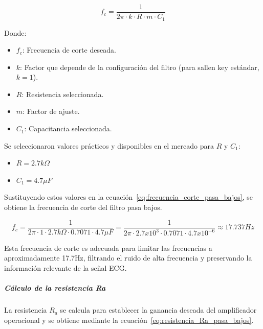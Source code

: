                     \begin{equation}
                        \label{eq:frecuencia_corte_pasa_bajos}
                        f_c = \frac{1}{2\pi \cdot k \cdot R \cdot m \cdot C_1}
                    \end{equation}

                    Donde:
                    \begin{itemize}
                        \item $f_c$: Frecuencia de corte deseada.
                        \item $k$: Factor que depende de la configuración del filtro (para sallen key estándar, $k = 1$).
                        \item $R$: Resistencia seleccionada.
                        \item $m$: Factor de ajuste.
                        \item $C_1$: Capacitancia seleccionada.
                    \end{itemize}

                    Se seleccionaron valores prácticos y disponibles en el mercado para $R$ y $C_1$:

                    \begin{itemize}
                        \item $R = 2.7 k\Omega$
                        \item $C_1 = 4.7 \mu F$
                    \end{itemize}

                    Sustituyendo estos valores en la ecuación~\ref{eq:frecuencia_corte_pasa_bajos}, se obtiene la frecuencia de corte del filtro pasa bajos.

                    \begin{equation}
                        \label{eq:frecuencia_corte_pasa_bajos_valor}
                        f_c = \frac{1}{2\pi \cdot 1 \cdot 2.7 k\Omega \cdot 0.7071\cdot 4.7 \mu F} = \frac{1}{2\pi \cdot 2.7 x10^3 \cdot 0.7071\cdot 4.7 x10^{-6}} \approx 17.737 Hz
                    \end{equation}

                    Esta frecuencia de corte es adecuada para limitar las frecuencias a aproximadamente 17.7Hz, filtrando el ruido de alta frecuencia y preservando la información relevante de la señal ECG.

                \subparagraph{Cálculo de la resistencia Ra}
                    La resistencia $R_a$ se calcula para establecer la ganancia deseada del amplificador operacional y se obtiene mediante la ecuación~\ref{eq:resistencia_Ra_pasa_bajos}.


